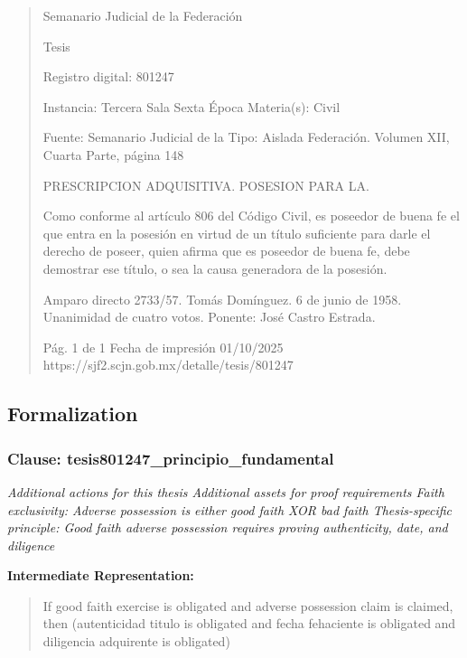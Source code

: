 \documentclass[11pt,a4paper]{article}
\begin{document}
\begin{quote}
                                                   Semanario Judicial de la Federación

                                                  Tesis

 Registro digital: 801247

 Instancia: Tercera Sala          Sexta Época                           Materia(s): Civil

                                  Fuente: Semanario Judicial de la      Tipo: Aislada
                                  Federación.
                                  Volumen XII, Cuarta Parte, página
                                  148


PRESCRIPCION ADQUISITIVA. POSESION PARA LA.


Como conforme al artículo 806 del Código Civil, es poseedor de buena fe el que entra en la
posesión en virtud de un título suficiente para darle el derecho de poseer, quien afirma que es
poseedor de buena fe, debe demostrar ese título, o sea la causa generadora de la posesión.


Amparo directo 2733/57. Tomás Domínguez. 6 de junio de 1958. Unanimidad de cuatro votos.
Ponente: José Castro Estrada.




                                             Pág. 1 de 1              Fecha de impresión 01/10/2025
  https://sjf2.scjn.gob.mx/detalle/tesis/801247

\end{quote}

\subsection{Formalization}

\subsubsection{Clause: tesis801247\_principio\_fundamental}

\textit{Additional actions for this thesis Additional assets for proof requirements Faith exclusivity: Adverse possession is either good faith XOR bad faith Thesis-specific principle: Good faith adverse possession requires proving authenticity, date, and diligence}

\textbf{Intermediate Representation:}

\begin{quote}
If good faith exercise is obligated and adverse possession claim is claimed, then (autenticidad titulo is obligated and fecha fehaciente is obligated and diligencia adquirente is obligated)
\end{quote}
\end{document}
